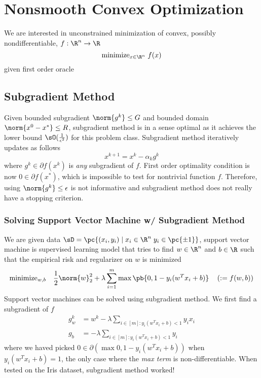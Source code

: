 \documentclass[../summary.tex]{subfiles}
\begin{document}
\section{Nonsmooth Convex Optimization}

We are interested in unconstrained minimization of convex, possibly nondifferentiable, $f:\R^n \to \R$ 
\[
    \text{minimize}_{x\in\R^n}\; f(x)
\]
given first order oracle

\subsection{Subgradient Method}

Given bounded subgradient $\norm{g^k}\leq G$ and bounded domain $\norm{x^0 - x^*} \leq R$, subgradient method is in a sense optimal as it achieves the lower bound $\sO(\frac{1}{\epsilon^2})$ for this problem class. Subgradient method iteratively updates as follows
\[
    x^{k+1}
        = x^k - \alpha_k g^k    
\]
where $g^k \in\partial f(x^k)$ is \textit{any} subgradient of $f$. First order optimality condition is now $0\in\partial f(x^*)$, which is impossible to test for nontrivial function $f$. Therefore, using $\norm{g^k}\leq \epsilon$ is not informative and subgradient method does not really have a stopping criterion.

\subsubsection{Solving Support Vector Machine w/ Subgradient Method}

We are given data $\sD = \pc{(x_i,y_i) \mid x_i\in\R^n \; y_i \in \pc{\pm 1}}$, support vector machine is supervised learning model that tries to find $w\in\R^n$ and $b\in\R$ such that the empirical risk and regularizer on $w$ is minimized
\begin{align*}
    \text{minimize}_{w,b} \quad
        \frac{1}{2} \norm{w}_2^2 + \lambda \sum_{i=1}^m \max\pb{0, 1 - y_i(w^Tx_i + b)} 
        \quad \left( := f(w,b) \right)
\end{align*}
Support vector machines can be solved using subgradient method. We first find a subgradient of $f$
\begin{align*}
    g_w^k
        &= w^k - \lambda \sum_{i\in[m]: y_i(w^Tx_i + b) < 1 } y_i x_i \\
    g_b
        &= -\lambda \sum_{i\in[m]: y_i(w^Tx_i + b) < 1 } y_i
\end{align*}
where we haved picked $0\in\partial (\max{0, 1- y_i(w^Tx_i + b)})$ when $y_i(w^Tx_i + b) = 1$, the only case where the \textit{max term} is non-differentiable. When tested on the Iris dataset, subgradient method worked!
\end{document}
